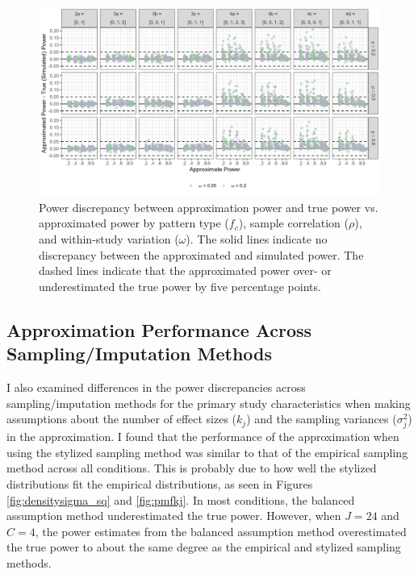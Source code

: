 \begin{figure}
    \centering
    \vspace{-5pt}\includegraphics[width=\linewidth]{chapters/plots/fc_rho_omega_empirical.png}\caption{Power discrepancy between approximation power and true power vs. approximated power by pattern type ($f_c$), sample correlation ($\rho$), and within-study variation ($\omega$). The solid lines indicate no discrepancy between the approximated and simulated power. The dashed lines indicate that the approximated power over- or underestimated the true power by five percentage points.}
    \label{fig: fc_rho_omega_empirical}
    \vspace{-5pt}
\end{figure}


\subsection{Approximation Performance Across Sampling/Imputation Methods}

I also examined differences in the power discrepancies across sampling/imputation methods for the primary study characteristics when making assumptions about the number of effect sizes ($k_j$) and the sampling variances ($\sigma_j^2$) in the approximation. I found that the performance of the approximation when using the stylized sampling method was similar to that of the empirical sampling method across all conditions. 
This is probably due to how well the stylized distributions fit the empirical distributions, as seen in Figures \ref{fig:densitysigma_sq} and \ref{fig:pmfkj}. In most conditions, the balanced assumption method underestimated the true power. However, when $J=24$ and $C=4$, the power estimates from the balanced assumption method overestimated the true power to about the same degree as the empirical and stylized sampling methods.

